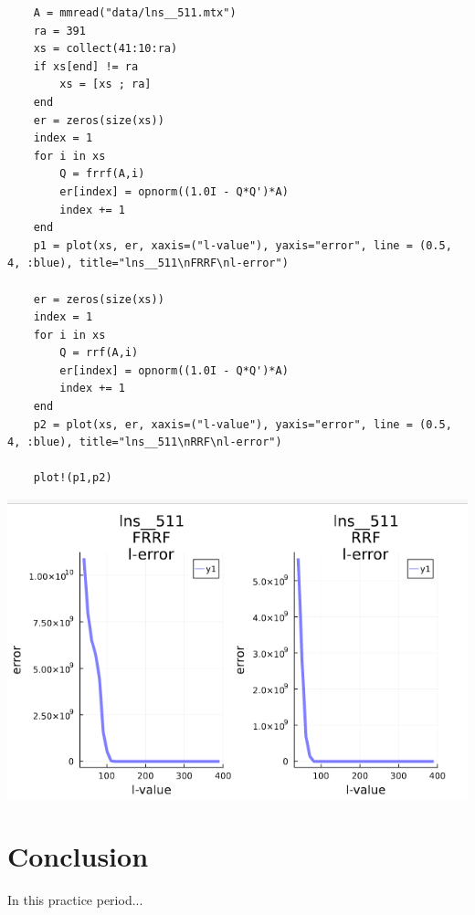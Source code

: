 \documentclass[11pt,a4paper]{article}
\theoremstyle{definition}
\begin{document}
	\begin{lstlisting}
	A = mmread("data/lns__511.mtx")
	ra = 391
	xs = collect(41:10:ra)
	if xs[end] != ra
	    xs = [xs ; ra]
	end
	er = zeros(size(xs))
	index = 1
	for i in xs 
	    Q = frrf(A,i)
	    er[index] = opnorm((1.0I - Q*Q')*A)
	    index += 1
	end
	p1 = plot(xs, er, xaxis=("l-value"), yaxis="error", line = (0.5, 4, :blue), title="lns__511\nFRRF\nl-error")
	
	er = zeros(size(xs))
	index = 1
	for i in xs 
	    Q = rrf(A,i)
	    er[index] = opnorm((1.0I - Q*Q')*A)
	    index += 1
	end
	p2 = plot(xs, er, xaxis=("l-value"), yaxis="error", line = (0.5, 4, :blue), title="lns__511\nRRF\nl-error")
	
	plot!(p1,p2)
	\end{lstlisting}
	\includegraphics[scale=0.5]{images/4.5_4.png}

	\section{Conclusion}
		In this practice period...
\end{document}
